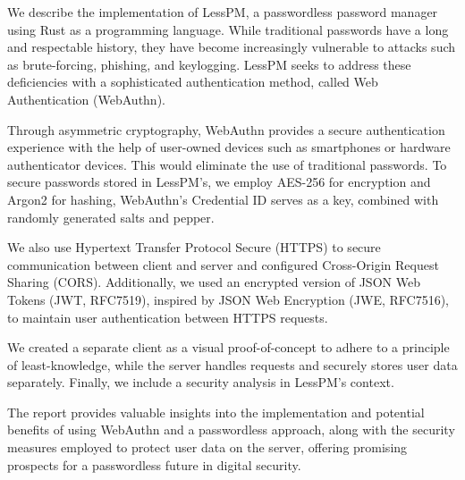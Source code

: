 We describe the implementation of LessPM, a passwordless password manager
using Rust as a programming language.
While traditional passwords have a long and respectable history, they have
become increasingly vulnerable to attacks such as brute-forcing, phishing, and
keylogging.
LessPM seeks to address these deficiencies with a sophisticated
authentication method, called Web Authentication (WebAuthn).

Through asymmetric cryptography, WebAuthn provides a secure authentication
experience with the help of user-owned devices such as smartphones or hardware
authenticator devices.
This would eliminate the use of traditional passwords.
To secure passwords stored in LessPM's, we employ AES-256 for encryption and
Argon2 for hashing, WebAuthn's Credential ID serves as a key, combined with
randomly generated salts and pepper.

We also use Hypertext Transfer Protocol Secure (HTTPS) to secure
communication between client and server and configured Cross-Origin Request
Sharing (CORS).
Additionally, we used an encrypted version of JSON Web Tokens (JWT, RFC7519),
inspired by JSON Web Encryption (JWE, RFC7516), to maintain user authentication
between HTTPS requests.

We created a separate client as a visual proof-of-concept to adhere to a
principle of least-knowledge, while the server handles requests and securely
stores user data separately.
Finally, we include a security analysis in LessPM's context.

The report provides valuable insights into the implementation and potential
benefits of using WebAuthn and a passwordless approach, along with the security
measures employed to protect user data on the server, offering promising
prospects for a passwordless future in digital security.
